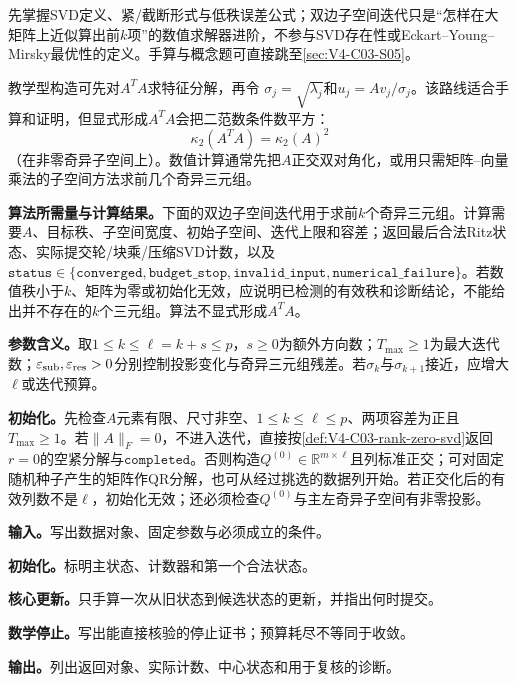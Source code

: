 \begin{keypointbox}[title=第一次阅读路线]
先掌握SVD定义、紧/截断形式与低秩误差公式；双边子空间迭代只是“怎样在大矩阵上近似算出前$k$项”的数值求解器进阶，不参与SVD存在性或Eckart--Young--Mirsky最优性的定义。手算与概念题可直接跳至\cref{sec:V4-C03-S05}。
\end{keypointbox}


教学型构造可先对$A^TA$求特征分解，再令
$\sigma_j=\sqrt{\lambda_j}$和$u_j=Av_j/\sigma_j$。该路线适合手算和证明，但显式形成$A^TA$会把二范数条件数平方：
\[
\kappa_2(A^TA)=\kappa_2(A)^2
\]
（在非零奇异子空间上）。数值计算通常先把$A$正交双对角化，或用只需矩阵--向量乘法的子空间方法求前几个奇异三元组。

\label{struct:V4-C03-CH10}

\label{struct:V4-C03-CH19}
\label{struct:V4-C03-CH20}
\textbf{算法所需量与计算结果。}下面的双边子空间迭代用于求前$k$个奇异三元组。计算需要$A$、目标秩、子空间宽度、初始子空间、迭代上限和容差；返回最后合法Ritz状态、实际提交轮/块乘/压缩SVD计数，以及$\mathtt{status}\in\{\mathtt{converged},\mathtt{budget\_stop},\mathtt{invalid\_input},\mathtt{numerical\_failure}\}$。若数值秩小于$k$、矩阵为零或初始化无效，应说明已检测的有效秩和诊断结论，不能给出并不存在的$k$个三元组。算法不显式形成$A^TA$。

\label{struct:V4-C03-CH21}
\textbf{参数含义。}取$1\leq k\leq\ell=k+s\leq p$，$s\geq0$为额外方向数；$T_{\max}\geq1$为最大迭代数；$\varepsilon_{\rm sub},\varepsilon_{\rm res}>0$分别控制投影变化与奇异三元组残差。若$\sigma_k$与$\sigma_{k+1}$接近，应增大$\ell$或迭代预算。

\label{struct:V4-C03-CH22}
\textbf{初始化。}先检查$A$元素有限、尺寸非空、$1\leq k\leq\ell\leq p$、两项容差为正且$T_{\max}\geq1$。若$\|A\|_F=0$，不进入迭代，直接按\cref{def:V4-C03-rank-zero-svd}返回$r=0$的空紧分解与$\mathtt{completed}$。否则构造$Q^{(0)}\in\mathbb R^{m\times\ell}$且列标准正交；可对固定随机种子产生的矩阵作QR分解，也可从经过挑选的数据列开始。若正交化后的有效列数不是$\ell$，初始化无效；还必须检查$Q^{(0)}$与主左奇异子空间有非零投影。


\begin{keypointbox}[title={截断SVD的双边子空间迭代：五步阅读}]
\textbf{输入。}写出数据对象、固定参数与必须成立的条件。\par
\textbf{初始化。}标明主状态、计数器和第一个合法状态。\par
\textbf{核心更新。}只手算一次从旧状态到候选状态的更新，并指出何时提交。\par
\textbf{数学停止。}写出能直接核验的停止证书；预算耗尽不等同于收敛。\par
\textbf{输出。}列出返回对象、实际计数、中心状态和用于复核的诊断。
\end{keypointbox}

